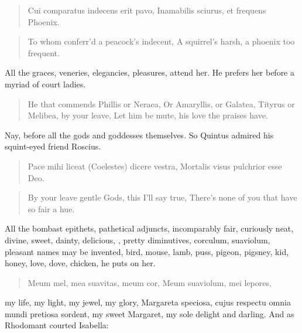 \begin{latin}
\begin{verse}
Cui comparatus indecens erit pavo,
Inamabilis sciurus, et frequens Phoenix.
\end{verse}
\end{latin}
\translationrule%
\begin{verse}%
To whom conferr'd a peacock's indecent,
A squirrel's harsh, a phoenix too frequent.
\end{verse}%

All the graces, veneries, elegancies, pleasures, attend her. He prefers
her before a myriad of court ladies.

\begin{verse}%
He that commends Phillis or Neraea,
Or Amaryllis, or Galatea,
Tityrus or Melibea, by your leave,
Let him be mute, his love the praises have.
\end{verse}%

Nay, before all the gods and goddesses themselves. So Quintus
\Catullus{} admired his squint-eyed friend Roscius.

\begin{latin}
\begin{verse}
Pace mihi liceat (Coelestes) dicere vestra,
Mortalis visus pulchrior esse Deo.
\end{verse}
\end{latin}
\translationrule%
\begin{verse}%
By your leave gentle Gods, this I'll say true,
There's none of you that have so fair a hue.
\end{verse}%

All the bombast epithets, pathetical adjuncts, incomparably fair,
curiously neat, divine, sweet, dainty, delicious, \etc{}, pretty
diminutives, corculum, suaviolum, \etc{} pleasant names may be invented,
bird, mouse, lamb, puss, pigeon, pigsney, kid, honey, love, dove,
chicken, \etc{} he puts on her.

\begin{latin}
\begin{verse}
Meum mel, mea suavitas, meum cor,
Meum suaviolum, mei lepores,
\end{verse}
\end{latin}

my life, my light, my jewel, my glory, Margareta speciosa, cujus
respectu omnia mundi pretiosa sordent, my sweet Margaret, my sole
delight and darling. And as Rhodomant courted Isabella:

